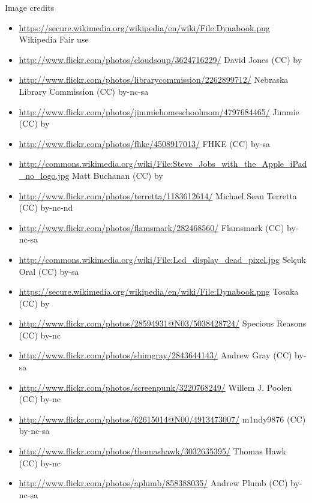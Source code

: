 \begin{frame}[plain]
  Image credits
  \tiny
  \begin{itemize}
    \item \url{https://secure.wikimedia.org/wikipedia/en/wiki/File:Dynabook.png} Wikipedia Fair use
    \item \url{http://www.flickr.com/photos/cloudsoup/3624716229/} David Jones (CC) by
    \item \url{http://www.flickr.com/photos/librarycommission/2262899712/} Nebraska Library Commission (CC) by-nc-sa
    \item \url{http://www.flickr.com/photos/jimmiehomeschoolmom/4797684465/} Jimmie (CC) by
    \item \url{http://www.flickr.com/photos/fhke/4508917013/} FHKE (CC) by-sa
    \item \url{http://commons.wikimedia.org/wiki/File:Steve_Jobs_with_the_Apple_iPad_no_logo.jpg} Matt Buchanan (CC) by
    \item \url{http://www.flickr.com/photos/terretta/1183612614/} Michael Sean Terretta (CC) by-nc-nd
    \item \url{http://www.flickr.com/photos/flamsmark/282468560/} Flamsmark (CC) by-nc-sa
    \item \url{http://commons.wikimedia.org/wiki/File:Lcd_display_dead_pixel.jpg} Selçuk Oral (CC) by-sa
    \item \url{https://secure.wikimedia.org/wikipedia/en/wiki/File:Dynabook.png} Tosaka (CC) by
    \item \url{http://www.flickr.com/photos/28594931@N03/5038428724/} Specious Reasons (CC) by-nc
    \item \url{http://www.flickr.com/photos/shimgray/2843644143/} Andrew Gray (CC) by-sa
    \item \url{http://www.flickr.com/photos/screenpunk/3220768249/} Willem J. Poolen (CC) by-nc
    \item \url{http://www.flickr.com/photos/62615014@N00/4913473007/} m1ndy9876 (CC) by-nc-sa
    \item \url{http://www.flickr.com/photos/thomashawk/3032635395/} Thomas Hawk (CC) by-nc
    \item \url{http://www.flickr.com/photos/aplumb/858388035/} Andrew Plumb (CC) by-nc-sa
  \end{itemize}
\end{frame}
